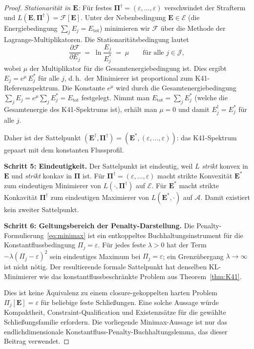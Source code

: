 \documentclass[12pt,a4paper]{article}
\theoremstyle{definition}
\theoremstyle{plain}
\theoremstyle{remark}
\begin{document}
\begin{proof}
\emph{Stationarität in $\mathbf{E}$:}\;
Für festes $\boldsymbol{\Pi}^\dagger = (\varepsilon, \dots, \varepsilon)$
verschwindet der Strafterm und
$L(\mathbf{E}, \boldsymbol{\Pi}^\dagger) = \mathcal{F}[\mathbf{E}]$.
Unter der Nebenbedingung $\mathbf{E} \in \mathcal{E}$ (die Energiebedingung
$\sum_j E_j = E_{\mathrm{tot}}$) minimieren wir $\mathcal{F}$ über die
Methode der Lagrange-Multiplikatoren. Die Stationaritätsbedingung lautet
\[
  \frac{\partial \mathcal{F}}{\partial E_j}
  \;=\;
  \ln\frac{E_j}{E_j^*}
  \;=\; \mu
  \qquad\text{für alle } j \in \mathcal{J},
\]
wobei $\mu$ der Multiplikator für die Gesamtenergiebedingung ist.
Dies ergibt $E_j = e^\mu\,E_j^*$ für alle $j$, d.\,h.\ der Minimierer ist
proportional zum K41-Referenzspektrum. Die Konstante $e^\mu$ wird
durch die Gesamtenergiebedingung
$\sum_j E_j = e^\mu \sum_j E_j^* = E_{\mathrm{tot}}$ festgelegt. Nimmt man
$E_{\mathrm{tot}} = \sum_j E_j^*$ (welche die Gesamtenergie des
K41-Spektrums ist), erhält man $\mu = 0$ und damit
$E_j^\dagger = E_j^*$ für alle $j$.

Daher ist der Sattelpunkt
$(\mathbf{E}^\dagger, \boldsymbol{\Pi}^\dagger) =
(\mathbf{E}^*, (\varepsilon, \dots, \varepsilon))$:
das K41-Spektrum gepaart mit dem konstanten Flussprofil.

\smallskip\noindent
\textbf{Schritt 5: Eindeutigkeit.}\;
Der Sattelpunkt ist eindeutig, weil $L$ \emph{strikt} konvex in
$\mathbf{E}$ und \emph{strikt} konkav in $\boldsymbol{\Pi}$ ist.
Für $\boldsymbol{\Pi}^\dagger=(\varepsilon,\ldots,\varepsilon)$ macht
strikte Konvexität $\mathbf{E}^*$ zum eindeutigen Minimierer von
$L(\cdot,\boldsymbol{\Pi}^\dagger)$ auf $\mathcal E$. Für
$\mathbf{E}^*$ macht strikte Konkavität $\boldsymbol{\Pi}^\dagger$ zum
eindeutigen Maximierer von $L(\mathbf{E}^*,\cdot)$ auf $\mathcal A$.
Damit existiert kein zweiter Sattelpunkt.

\smallskip\noindent
\textbf{Schritt 6: Geltungsbereich der Penalty-Darstellung.}\;
Die Penalty-Formulierung~\eqref{eq:minimax} ist ein entkoppeltes
Buchhaltungsinstrument für die Konstantflussbedingung
$\Pi_j=\varepsilon$. Für jedes feste $\lambda>0$ hat der Term
$-\lambda(\Pi_j-\varepsilon)^2$ sein eindeutiges Maximum bei
$\Pi_j=\varepsilon$; ein Grenzübergang $\lambda\to\infty$ ist nicht
nötig. Der resultierende formale Sattelpunkt hat denselben KL-Minimierer
wie das konstantflussbeschränkte Problem aus Theorem~\ref{thm:K41}.

Dies ist keine Äquivalenz zu einem closure-gekoppelten harten Problem
$\Pi_j[\mathbf{E}]=\varepsilon$ für beliebige feste Schließungen. Eine
solche Aussage würde Kompaktheit, Constraint-Qualification und
Existenzsätze für die gewählte Schließungsfamilie erfordern. Die
vorliegende Minimax-Aussage ist nur das endlichdimensionale
Konstantfluss-Penalty-Buchhaltungslemma, das dieser Beitrag verwendet.
\end{proof}
\end{document}
